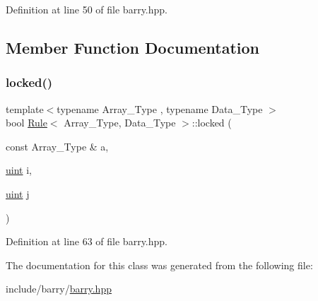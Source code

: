 Definition at line 50 of file barry.\+hpp.



\subsection{Member Function Documentation}
\mbox{\label{classbarry_1_1_rule_acc6742a89bbc5a29384e26dfd7a9488f}} 
\subsubsection{\texorpdfstring{locked()}{locked()}}
{\footnotesize\ttfamily template$<$typename Array\+\_\+\+Type , typename Data\+\_\+\+Type $>$ \\
bool \hyperlink{classbarry_1_1_rule}{Rule}$<$ Array\+\_\+\+Type, Data\+\_\+\+Type $>$\+::locked (\begin{DoxyParamCaption}\item[{const Array\+\_\+\+Type \&}]{a,  }\item[{\hyperlink{namespacebarry_a11dfc53ddb4672278319aa04f1e09a6c}{uint}}]{i,  }\item[{\hyperlink{namespacebarry_a11dfc53ddb4672278319aa04f1e09a6c}{uint}}]{j }\end{DoxyParamCaption})\hspace{0.3cm}{\ttfamily [inline]}}



Definition at line 63 of file barry.\+hpp.



The documentation for this class was generated from the following file\+:\begin{DoxyCompactItemize}
\item 
include/barry/\hyperlink{barry_8hpp}{barry.\+hpp}\end{DoxyCompactItemize}
